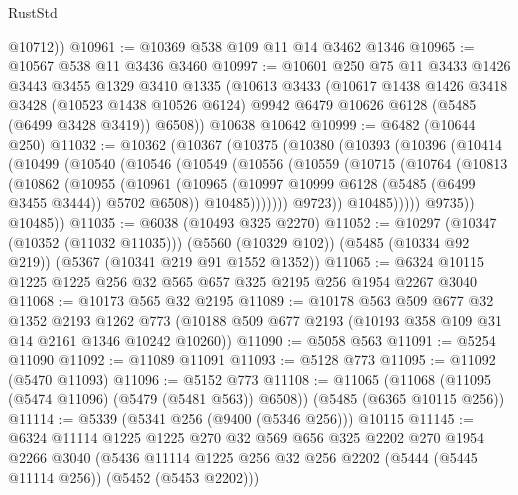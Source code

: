 \begin{lexlean}{RustStd}
\begin{coremodule}
        @10712))
@10961 := @10369 @538 @109 @11 @14 @3462 @1346
@10965 := @10567 @538 @11 @3436 @3460
@10997 := @10601
    @250
    @75
    @11
    @3433
    @1426
    @3443
    @3455
    @1329
    @3410
    @1335
    (@10613
      @3433
      (@10617
        @1438
        @1426
        @3418
        @3428
        (@10523 @1438 @10526 @6124)
        @9942
        @6479
        @10626
        @6128
        (@5485 (@6499 @3428 @3419))
        @6508))
    @10638
    @10642
@10999 := @6482 (@10644 @250)
@11032 := @10362
    (@10367
      (@10375
        (@10380
          (@10393
            (@10396
              (@10414
                (@10499
                  (@10540
                    (@10546
                      (@10549
                        (@10556
                          (@10559
                            (@10715
                              (@10764
                                (@10813
                                  (@10862
                                    (@10955
                                      (@10961
                                        (@10965
                                          (@10997
                                            @10999
                                            @6128
                                            (@5485 (@6499 @3455 @3444))
                                            @5702
                                            @6508))
                                        @10485)))))))
                          @9723))
                      @10485)))))
            @9735))
        @10485))
@11035 := @6038 (@10493 @325 @2270)
@11052 := @10297
    (@10347 (@10352 (@11032 @11035)))
    (@5560 (@10329 @102))
    (@5485 (@10334 @92 @219))
    (@5367 (@10341 @219 @91 @1552 @1352))
@11065 := @6324 @10115 @1225 @1225 @256 @32 @565 @657 @325 @2195 @256 @1954 @2267 @3040
@11068 := @10173 @565 @32 @2195
@11089 := @10178
    @563
    @509
    @677
    @32
    @1352
    @2193
    @1262
    @773
    (@10188 @509 @677 @2193 (@10193 @358 @109 @31 @14 @2161 @1346 @10242 @10260))
@11090 := @5058 @563
@11091 := @5254 @11090
@11092 := @11089 @11091
@11093 := @5128 @773
@11095 := @11092 (@5470 @11093)
@11096 := @5152 @773
@11108 := @11065
    (@11068 (@11095 (@5474 @11096) (@5479 (@5481 @563)) @6508))
    (@5485 (@6365 @10115 @256))
@11114 := @5339 (@5341 @256 (@9400 (@5346 @256))) @10115
@11145 := @6324
    @11114
    @1225
    @1225
    @270
    @32
    @569
    @656
    @325
    @2202
    @270
    @1954
    @2266
    @3040
    (@5436 @11114 @1225 @256 @32 @256 @2202 (@5444 (@5445 @11114 @256)) (@5452 (@5453 @2202)))

\end{coremodule}
\end{lexlean}
